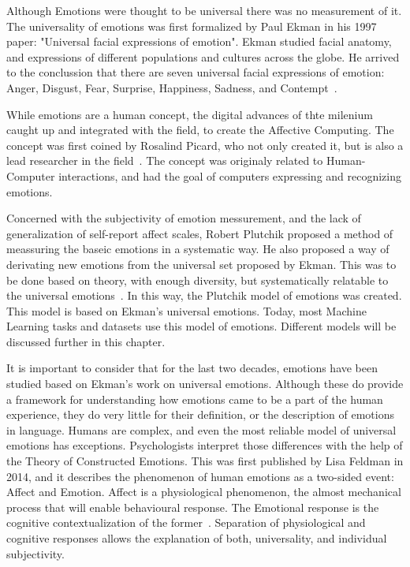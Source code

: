 Although Emotions were thought to be universal there was no measurement of it. The universality of emotions was first formalized by Paul Ekman in his 1997 paper: "Universal facial expressions of emotion". Ekman studied facial anatomy, and expressions of different populations and cultures across the globe. He arrived to the conclussion that there are seven universal facial expressions of emotion:
Anger, Disgust, Fear, Surprise, Happiness, Sadness, and Contempt~\cite{ekman1997universal}\cite{ekman1992basic}.

While emotions are a human concept, the digital advances of thte milenium caught up and integrated with the field, to create the Affective Computing. The concept was first coined by Rosalind Picard, who not only created it, but is also a lead researcher in the field~\cite{picard2000affective}. The concept was originaly related to Human-Computer interactions, and had the goal of computers expressing and recognizing emotions.

Concerned with the subjectivity of emotion messurement, and the lack of generalization of self-report affect scales, Robert Plutchik proposed a method of meassuring the baseic emotions in a systematic way. He also proposed a way of derivating new emotions from the universal set proposed by Ekman. This was to be done based on theory, with enough diversity, but systematically relatable to the universal emotions~\cite{plutchik2013measurement}. In this way, the Plutchik model of emotions was created. This model is based on Ekman's universal emotions. Today, most Machine Learning tasks and datasets use this model of emotions. Different models will be discussed further in this chapter.

It is important to consider that for the last two decades, emotions have been studied based on Ekman's work on universal emotions. Although these do provide a framework for understanding how emotions came to be a part of the human experience, they do very little for their definition, or the description of emotions in language. Humans are complex, and even the most reliable model of universal emotions has exceptions. Psychologists interpret those differences with the help of the Theory of Constructed Emotions. This was first published by Lisa Feldman in 2014, and it describes the phenomenon of human emotions as a two-sided event: Affect and Emotion. Affect is a physiological phenomenon, the almost mechanical process that will enable behavioural response. The Emotional response is the cognitive contextualization of the former~\cite{feldman2014constructed}. Separation of physiological and cognitive responses allows the explanation of both, universality, and individual subjectivity.


